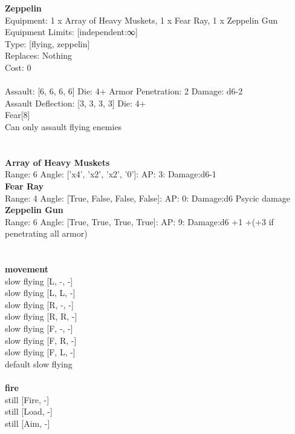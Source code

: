 {\bf Zeppelin } \\
Equipment: 1 x Array of Heavy Muskets, 1 x Fear Ray, 1 x Zeppelin Gun \\
Equipment Limits: [independent:∞] \\
Type: [flying, zeppelin] \\
Replaces: Nothing \\
Cost: 0\\
\ \\
Assault: [6, 6, 6, 6] Die: 4+ Armor Penetration: 2 Damage: d6-2 \\
Assault Deflection: [3, 3, 3, 3] Die: 4+\\
\indent Fear[8]\\ 
Can only assault flying enemies\\ 
 
\ \\

\ \\
{\bf Array of Heavy Muskets } \\



Range: 6  Angle: ['x4', 'x2', 'x2', '0']: AP: 3: Damage:d6-1 \\




{\bf Fear Ray } \\



Range: 4  Angle: [True, False, False, False]: AP: 0: Damage:d6 Psycic damage \\




{\bf Zeppelin Gun } \\



Range: 6  Angle: [True, True, True, True]: AP: 9: Damage:d6 +1 +(+3 if penetrating all armor) \\




 
\ \\



\ \\ {\bf movement } \\
slow flying [L, -, -] \\
slow flying [L, L, -] \\
slow flying [R, -, -] \\
slow flying [R, R, -] \\
slow flying [F, -, -] \\
slow flying [F, R, -] \\
slow flying [F, L, -] \\
default slow flying \\
\ \\ {\bf fire } \\
still [Fire, -] \\
still [Load, -] \\
still [Aim, -] \\


